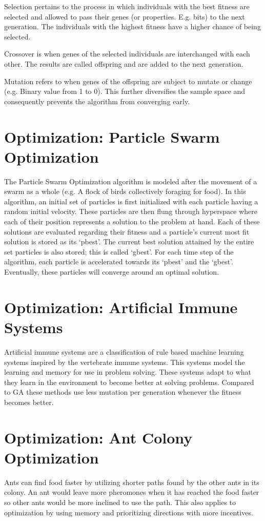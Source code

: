 Selection pertains to the process in which individuals with the best fitness are selected and allowed to pass their genes (or properties. E.g. bits) to the next generation. The individuals with the highest fitness have a higher chance of being selected.

Crossover is when genes of the selected individuals are interchanged with each other. The results are called offspring and are added to the next generation.

Mutation refers to when genes of the offspring are subject to mutate or change (e.g. Binary value from 1 to 0). This further diversifies the sample space and consequently prevents the algorithm from converging early.

\section{Optimization: Particle Swarm Optimization}
The Particle Swarm Optimization \cite{eberhart_kennedy_1995} algorithm is modeled after the movement of a swarm as a whole (e.g. A flock
of birds collectively foraging for food). In this algorithm, an initial set of particles is first initialized with each
particle having a random initial velocity. These particles are then flung through hyperspace where each of their position
represents a solution to the problem at hand. Each of these solutions are evaluated regarding their fitness and a particle's
current most fit solution is stored as its `pbest'. The current best solution attained by the entire set particles is also stored; this is called `gbest'. For each time step of the algorithm, each particle is accelerated towards its `pbest' and the `gbest'. Eventually, these particles will converge around an optimal solution.

\section{Optimization: Artificial Immune Systems}
Artificial immune systems are a classification of rule based machine learning systems inspired by the vertebrate immune systems. This systems model the learning and memory for use in problem solving. These systems adapt to what they learn in the environment to become better at solving problems. Compared to GA these methods use less mutation per generation whenever the fitness becomes better.

\section{Optimization: Ant Colony Optimization}
Ants can find food faster by utilizing shorter paths found by the other ants in its colony. An ant would leave more pheromones when it has reached the food faster so other ants would be more inclined to use the path. This also applies to optimization by using memory and prioritizing directions with more incentives.


